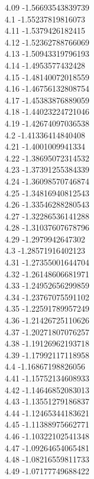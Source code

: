 {4.09	-1.56693543839739\\
4.1	-1.55237819816073\\
4.11	-1.5379426182415\\
4.12	-1.52362788766069\\
4.13	-1.50943319796193\\
4.14	-1.4953577432428\\
4.15	-1.48140072018559\\
4.16	-1.46756132808754\\
4.17	-1.45383876889059\\
4.18	-1.44023224721046\\
4.19	-1.42674097036538\\
4.2	-1.41336414840408\\
4.21	-1.4001009941334\\
4.22	-1.38695072314532\\
4.23	-1.37391255384339\\
4.24	-1.36098570746874\\
4.25	-1.34816940812543\\
4.26	-1.33546288280543\\
4.27	-1.32286536141288\\
4.28	-1.31037607678796\\
4.29	-1.2979942647302\\
4.3	-1.28571916402123\\
4.31	-1.27355001644704\\
4.32	-1.26148606681971\\
4.33	-1.24952656299859\\
4.34	-1.23767075591102\\
4.35	-1.22591789957249\\
4.36	-1.21426725110626\\
4.37	-1.20271807076257\\
4.38	-1.19126962193718\\
4.39	-1.17992117118958\\
4.4	-1.16867198826056\\
4.41	-1.15752134608933\\
4.42	-1.14646852083013\\
4.43	-1.13551279186837\\
4.44	-1.12465344183621\\
4.45	-1.11388975662771\\
4.46	-1.10322102541348\\
4.47	-1.09264654065481\\
4.48	-1.08216559811733\\
4.49	-1.07177749688422\\
}
